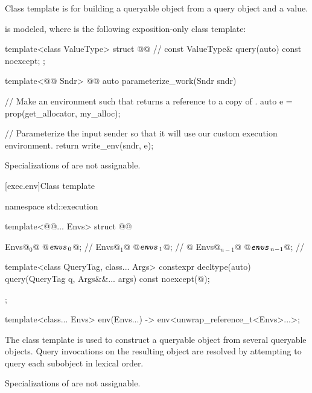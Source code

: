 \pnum
Class template  is for building a queryable object
from a query object and a value.

\pnum
\mandates
{}
is modeled,
where  is the following exposition-only class template:
\begin{codeblock}
template<class ValueType>
struct @@ {              // \expos
  const ValueType& query(auto) const noexcept;
};
\end{codeblock}

\pnum
\begin{example}
\begin{codeblock}
template<@@ Sndr>
@@ auto parameterize_work(Sndr sndr) {
  // Make an environment such that  returns a reference to a copy of .
  auto e = prop(get_allocator, my_alloc{});

  // Parameterize the input sender so that it will use our custom execution environment.
  return write_env(sndr, e);
}
\end{codeblock}
\end{example}

\pnum
Specializations of  are not assignable.

[exec.env]{Class template }

\begin{codeblock}
namespace std::execution {
  template<@@... Envs>
  struct @@ {
    Envs@$_0$@ @$\exposid{envs}_0$@;               // \expos
    Envs@$_1$@ @$\exposid{envs}_1$@;               // \expos
      @\vdots@
    Envs@$_{n-1}$@ @$\exposid{envs}_{n-1}$@;           // \expos

    template<class QueryTag, class... Args>
      constexpr decltype(auto) query(QueryTag q, Args&&... args) const noexcept(@\seebelow@);
  };

  template<class... Envs>
    env(Envs...) -> env<unwrap_reference_t<Envs>...>;
}
\end{codeblock}

\pnum
The class template  is used to construct a queryable object
from several queryable objects.
Query invocations on the resulting object are resolved
by attempting to query each subobject in lexical order.

\pnum
Specializations of  are not assignable.


